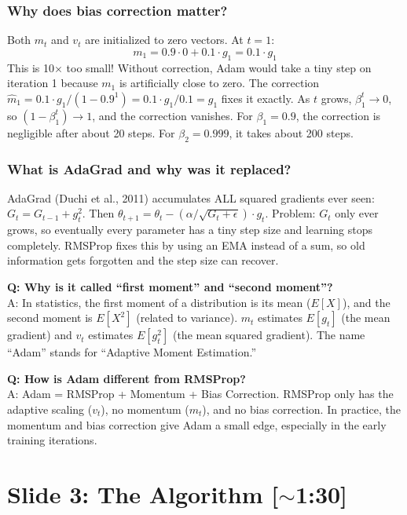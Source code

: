 \documentclass[11pt, letterpaper]{article}
\begin{document}
\begin{deepdive}
\subsubsection{Why does bias correction matter?}
Both $m_t$ and $v_t$ are initialized to zero vectors. At $t = 1$:
$$m_1 = 0.9 \cdot 0 + 0.1 \cdot g_1 = 0.1 \cdot g_1$$
This is 10$\times$ too small! Without correction, Adam would take a tiny step on iteration 1 because $m_1$ is artificially close to zero. The correction $\hat{m}_1 = 0.1 \cdot g_1 / (1 - 0.9^1) = 0.1 \cdot g_1 / 0.1 = g_1$ fixes it exactly. As $t$ grows, $\beta_1^t \to 0$, so $(1 - \beta_1^t) \to 1$, and the correction vanishes. For $\beta_1 = 0.9$, the correction is negligible after about 20 steps. For $\beta_2 = 0.999$, it takes about 200 steps.

\subsubsection{What is AdaGrad and why was it replaced?}
AdaGrad (Duchi et al., 2011) accumulates ALL squared gradients ever seen: $G_t = G_{t-1} + g_t^2$. Then $\theta_{t+1} = \theta_t - (\alpha / \sqrt{G_t + \epsilon}) \cdot g_t$. Problem: $G_t$ only ever grows, so eventually every parameter has a tiny step size and learning stops completely. RMSProp fixes this by using an EMA instead of a sum, so old information gets forgotten and the step size can recover.
\end{deepdive}

\begin{qabox}
\textbf{Q: Why is it called ``first moment'' and ``second moment''?}\\
A: In statistics, the first moment of a distribution is its mean ($E[X]$), and the second moment is $E[X^2]$ (related to variance). $m_t$ estimates $E[g_t]$ (the mean gradient) and $v_t$ estimates $E[g_t^2]$ (the mean squared gradient). The name ``Adam'' stands for ``Adaptive Moment Estimation.''

\textbf{Q: How is Adam different from RMSProp?}\\
A: Adam = RMSProp + Momentum + Bias Correction. RMSProp only has the adaptive scaling ($v_t$), no momentum ($m_t$), and no bias correction. In practice, the momentum and bias correction give Adam a small edge, especially in the early training iterations.
\end{qabox}


\section{Slide 3: The Algorithm \textnormal{\color{muted}[$\sim$1:30]}}
\end{document}
